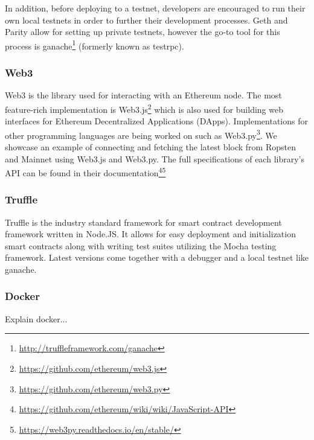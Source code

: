 In addition, before deploying to a testnet, developers are encouraged to run their own local testnets in order to further their development processes. Geth and Parity allow for setting up private testnets, however the go-to tool for this process is ganache\footnote{\url{http://truffleframework.com/ganache}} (formerly known as testrpc).

\subsubsection{Web3}
Web3 is the library used for interacting with an Ethereum node. The most feature-rich implementation is Web3.js\footnote{\url{https://github.com/ethereum/web3.js}} which is also used for building web interfaces for Ethereum Decentralized Applications (DApps). Implementations for other programming languages are being worked on such as Web3.py\footnote{\url{https://github.com/ethereum/web3.py}}. We showcase an example of connecting and fetching the latest block from Ropsten and Mainnet using Web3.js and Web3.py. The full specifications of each library's API can be found in their documentation\footnote{\url{https://github.com/ethereum/wiki/wiki/JavaScript-API}}\footnote{\url{https://web3py.readthedocs.io/en/stable/}}




\subsubsection{Truffle}
Truffle is the industry standard framework for smart contract development framework written in Node.JS. It allows for easy deployment and initialization smart contracts along with writing test suites utilizing the Mocha testing framework. Latest versions come together with a debugger and a local testnet like ganache. 

\subsubsection{Docker}
Explain docker...